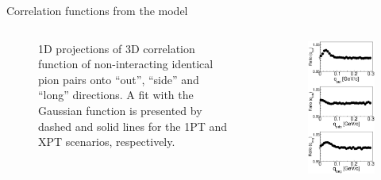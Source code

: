 \documentclass[final,hyperref={pdfpagelabels=false}, xcolor=dvipsnames]{beamer}
\begin{document}
\begin{frame}[shrink=30]
\begin{columns}[t]
\begin{block}{Correlation functions from the model}
\begin{columns}[t]
\begin{figure}[H]
          \caption{1D projections of 3D correlation function 
    of non-interacting identical pion pairs onto ``out'', ``side'' and ``long'' directions.  
   A fit with the Gaussian function is presented by dashed and solid lines for the 1PT and XPT scenarios, respectively.}
      \end{figure}
     \begin{figure}[H]
         \includegraphics[width=0.99\linewidth]{fig3_poster.eps}

\end{figure}
\end{columns}
\end{block}
\end{columns}
\end{frame}
\end{document}
